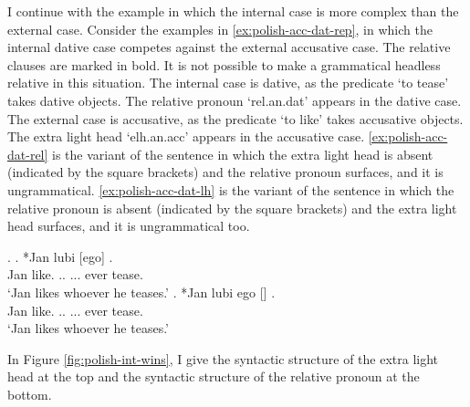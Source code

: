 I continue with the example in which the internal case is more complex than the external case.
Consider the examples in \ref{ex:polish-acc-dat-rep}, in which the internal dative case competes against the external accusative case. The relative clauses are marked in bold. It is not possible to make a grammatical headless relative in this situation.
The internal case is dative, as the predicate  `to tease' takes dative objects. The relative pronoun  `\ac{rel}.\ac{an}.\ac{dat}' appears in the dative case.
The external case is accusative, as the predicate  `to like' takes accusative objects. The extra light head  `\ac{elh}.\ac{an}.\ac{acc}' appears in the accusative case.
\ref{ex:polish-acc-dat-rel} is the variant of the sentence in which the extra light head is absent (indicated by the square brackets) and the relative pronoun surfaces, and it is ungrammatical.
\ref{ex:polish-acc-dat-lh} is the variant of the sentence in which the relative pronoun is absent (indicated by the square brackets) and the extra light head surfaces, and it is ungrammatical too.

\ex.\label{ex:polish-acc-dat-rep}
\ag. *Jan lubi [ego]   .\\
Jan like.\scsub{[acc]} .. ... ever tease.\scsub{[dat]}\\
`Jan likes whoever he teases.' \label{ex:polish-acc-dat-rel}
\bg. *Jan lubi ego []  .\\
Jan like.\scsub{[acc]} .. ... ever tease.\scsub{[dat]}\\
`Jan likes whoever he teases.' \label{ex:polish-acc-dat-lh}

In Figure \ref{fig:polish-int-wins}, I give the syntactic structure of the extra light head at the top and the syntactic structure of the relative pronoun at the bottom.

